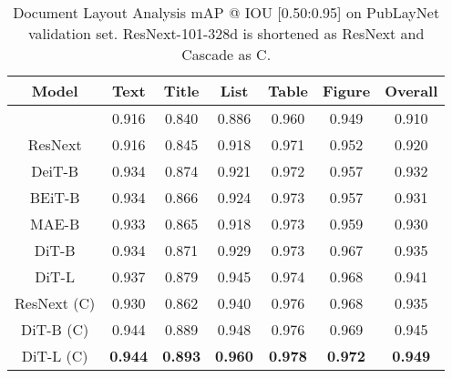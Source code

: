 \documentclass[sigconf]{acmart}
\begin{document}
\begin{table}[t]
    \centering
    \setlength{\tabcolsep}{3.0pt}
    \begin{tabular}{ccccccc}
        \toprule
        \multicolumn{1}{c}{\bf Model} & \bf Text & \bf Title & \bf List & \bf Table & \bf Figure & \bf Overall \\
        \midrule
\citep{zhong2019publaynet} & 0.916 & 0.840 & 0.886 & 0.960 & 0.949 & 0.910\\
        \midrule
        ResNext &0.916 &0.845 &0.918 &0.971 &0.952 &0.920 \\
        
        DeiT-B & 0.934 & 0.874 & 0.921 & 0.972 & 0.957 & 0.932\\
BEiT-B & 0.934 & 0.866 & 0.924 & 0.973 & 0.957 & 0.931\\
        MAE-B & 0.933 & 0.865 & 0.918 &  0.973 & 0.959 & 0.930 \\
\midrule
        DiT-B & 0.934 & 0.871 & 0.929 & 0.973 & 0.967 & 0.935   \\
        DiT-L & 0.937 & 0.879 & 0.945 & 0.974 & 0.968 & 0.941 \\
        \midrule
        ResNext (C) &0.930 &0.862 &0.940 &0.976 &0.968 &0.935\\
        DiT-B (C) & 0.944 & 0.889 & 0.948 & 0.976 & 0.969 & 0.945\\
        DiT-L (C) & \bf 0.944 & \bf 0.893 & \bf 0.960 & \bf 0.978 & \bf 0.972 & \bf 0.949\\
\bottomrule
    \end{tabular}
    \caption{Document Layout Analysis mAP @ IOU [0.50:0.95] on PubLayNet validation set. ResNext-101-328d is shortened as ResNext and Cascade as C.}
    \label{tab:layout}
\end{table}
\end{document}
